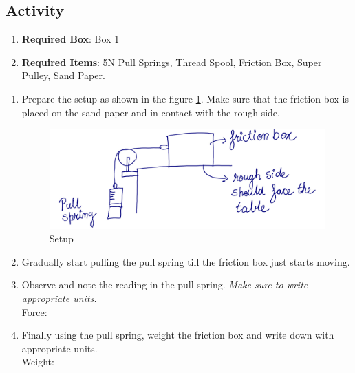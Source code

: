 \documentclass[10pt]{article}
\begin{document}
\subsection{Activity}
\begin{enumerate}
\item \textbf{Required Box}: Box 1
\item \textbf{Required Items}: 5N Pull Springs, Thread Spool, Friction Box, Super Pulley, Sand Paper.
\end{enumerate}
\begin{enumerate}
\item Prepare the setup as shown in the figure \ref{pulleyfri}.  Make sure that the friction box is placed on the sand paper and in contact with the rough side.
\begin{figure}[h]
\label{pulleyfri}
\includegraphics[scale=.5]{pulleyfric}
\centering
\caption{Setup}
\end{figure}
\item Gradually start pulling the pull spring till the friction box just starts moving.
\item Observe and note the reading in the pull spring.  \emph{Make sure to write appropriate units.}\\
Force:\underline{\hspace{5cm}}
\item Finally using the pull spring, weight the friction box and write down with appropriate units.\\  Weight:\underline{\hspace{5cm}}
\end{enumerate}
\end{document}
